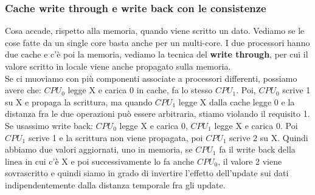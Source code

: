 \documentclass[14pt, oneside]{book}
\begin{document}
\subsubsection{Cache write through e write back con le consistenze}
Cosa accade, rispetto alla memoria, quando viene scritto un dato. Vediamo se le cose fatte da un single core basta anche per un multi-core. I due processori hanno due cache e c'è poi la memoria, vediamo la tecnica del \textbf{write through}, per cui il valore scritto in locale viene anche propagato sulla memoria.\\
Se ci muoviamo con più componenti associate a processori differenti, possiamo avere che: $CPU_0$ legge X e carica 0 in cache, fa lo stesso $CPU_1$. Poi, $CPU_0$ scrive 1 su X e propaga la scrittura, ma quando $CPU_1$ legge X dalla cache legge 0 e la distanza fra le due operazioni può essere arbitraria, stiamo violando il requisito 1.\\ 
Se usassimo write back: $CPU_0$ legge X e carica 0, $CPU_1$ legge X e carica 0. Poi $CPU_1$ scrive 1 e la scrittura non viene propagata, poi $CPU_1$ scrive 2 su X. Quindi abbiamo due valori aggiornati, uno in memoria, se $CPU_1$ fa il write back della linea in cui c'è X e poi successivamente lo fa anche $CPU_0$, il valore 2 viene sovrascritto e quindi siamo in grado di invertire l'effetto dell'update sui dati indipendentemente dalla distanza temporale fra gli update.
\end{document}
